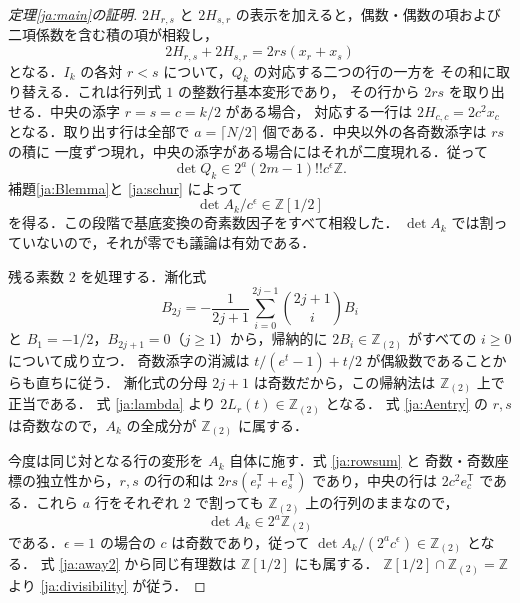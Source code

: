 \documentclass[12pt]{amsart}
\theoremstyle{definition}
\theoremstyle{remark}
\numberwithin{equation}{section}
\newcommand{\Z}{\mathbb{Z}}
\newcommand{\Ztwo}{\Z_{(2)}}
\theoremstyle{definition}
\theoremstyle{remark}
\begin{document}
\begin{proof}[定理\ref{ja:main}の証明]
$2H_{r,s}$ と $2H_{s,r}$ の表示を加えると，偶数・偶数の項および
二項係数を含む積の項が相殺し，
\begin{equation}\label{ja:rowsum}
 2H_{r,s}+2H_{s,r}=2rs(x_r+x_s)
\end{equation}
となる．$I_k$ の各対 $r<s$ について，$Q_k$ の対応する二つの行の一方を
その和に取り替える．これは行列式 $1$ の整数行基本変形であり，
その行から $2rs$ を取り出せる．中央の添字 $r=s=c=k/2$ がある場合，
対応する一行は $2H_{c,c}=2c^2x_c$ となる．取り出す行は全部で
$a=\lceil N/2\rceil$ 個である．中央以外の各奇数添字は $rs$ の積に
一度ずつ現れ，中央の添字がある場合にはそれが二度現れる．従って
\[
 \det Q_k\in2^a(2m-1)!!c^\epsilon\Z.
\]
補題\ref{ja:Blemma}と \eqref{ja:schur} によって
\begin{equation}\label{ja:away2}
 \det A_k/c^\epsilon\in\Z[1/2]
\end{equation}
を得る．この段階で基底変換の奇素数因子をすべて相殺した．
$\det A_k$ では割っていないので，それが零でも議論は有効である．

残る素数 $2$ を処理する．漸化式
\[
 B_{2j}=-\frac1{2j+1}\sum_{i=0}^{2j-1}\binom{2j+1}{i}B_i
\]
と $B_1=-1/2$，$B_{2j+1}=0$（$j\geq1$）から，帰納的に
$2B_i\in\Ztwo$ がすべての $i\geq0$ について成り立つ．
奇数添字の消滅は $t/(e^t-1)+t/2$ が偶級数であることからも直ちに従う．
漸化式の分母 $2j+1$ は奇数だから，この帰納法は $\Ztwo$ 上で正当である．
式 \eqref{ja:lambda} より $2L_r(t)\in\Ztwo$ となる．
式 \eqref{ja:Aentry} の $r,s$ は奇数なので，$A_k$ の全成分が
$\Ztwo$ に属する．

今度は同じ対となる行の変形を $A_k$ 自体に施す．式 \eqref{ja:rowsum} と
奇数・奇数座標の独立性から，$r,s$ の行の和は
$2rs(e_r^{\mathsf T}+e_s^{\mathsf T})$ であり，中央の行は
$2c^2e_c^{\mathsf T}$ である．これら $a$ 行をそれぞれ $2$ で割っても
$\Ztwo$ 上の行列のままなので，
\[
 \det A_k\in2^a\Ztwo
\]
である．$\epsilon=1$ の場合の $c$ は奇数であり，従って
$\det A_k/(2^ac^\epsilon)\in\Ztwo$ となる．
式 \eqref{ja:away2} から同じ有理数は $\Z[1/2]$ にも属する．
$\Z[1/2]\cap\Ztwo=\Z$ より \eqref{ja:divisibility} が従う．
\end{proof}
\end{document}
